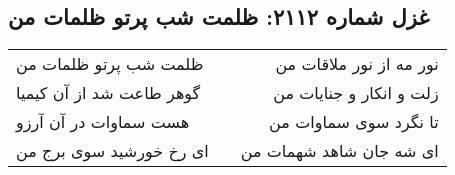 \begin{center}
\section*{غزل شماره ۲۱۱۲: ظلمت شب پرتو ظلمات من}
\label{sec:2112}
\begin{longtable}{l p{0.5cm} r}
ظلمت شب پرتو ظلمات من
&&
نور مه از نور ملاقات من
\\
گوهر طاعت شد از آن کیمیا
&&
زلت و انکار و جنایات من
\\
هست سماوات در آن آرزو
&&
تا نگرد سوی سماوات من
\\
ای رخ خورشید سوی برج من
&&
ای شه جان شاهد شهمات من
\\
\end{longtable}
\end{center}
